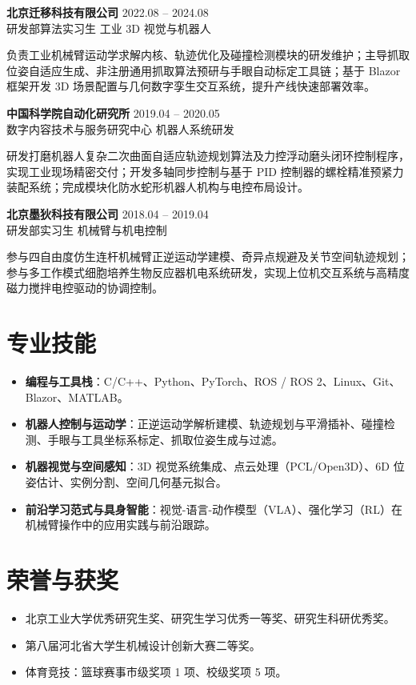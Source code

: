 \documentclass[10.5pt,a4paper]{article}
\newcommand{\entry}[4]{%
  \noindent\textbf{#1} \hfill #2\\
  {\color{subtextgray}#3} \hfill {#4}\par\vspace{1.5pt}
}
\begin{document}
\entry{北京迁移科技有限公司}{2022.08 -- 2024.08}{研发部算法实习生}{工业 3D 视觉与机器人}
负责工业机械臂运动学求解内核、轨迹优化及碰撞检测模块的研发维护；主导抓取位姿自适应生成、非注册通用抓取算法预研与手眼自动标定工具链；基于 Blazor 框架开发 3D 场景配置与几何数字孪生交互系统，提升产线快速部署效率。

\entry{中国科学院自动化研究所}{2019.04 -- 2020.05}{数字内容技术与服务研究中心}{机器人系统研发}
研发打磨机器人复杂二次曲面自适应轨迹规划算法及力控浮动磨头闭环控制程序，实现工业现场精密交付；开发多轴同步控制与基于 PID 控制器的螺栓精准预紧力装配系统；完成模块化防水蛇形机器人机构与电控布局设计。

\entry{北京墨狄科技有限公司}{2018.04 -- 2019.04}{研发部实习生}{机械臂与机电控制}
参与四自由度仿生连杆机械臂正逆运动学建模、奇异点规避及关节空间轨迹规划；参与多工作模式细胞培养生物反应器机电系统研发，实现上位机交互系统与高精度磁力搅拌电控驱动的协调控制。

\section*{专业技能}
\begin{itemize}
	\item \textbf{编程与工具栈}：C/C++、Python、PyTorch、ROS / ROS 2、Linux、Git、Blazor、MATLAB。
	\item \textbf{机器人控制与运动学}：正逆运动学解析建模、轨迹规划与平滑插补、碰撞检测、手眼与工具坐标系标定、抓取位姿生成与过滤。
	\item \textbf{机器视觉与空间感知}：3D 视觉系统集成、点云处理（PCL/Open3D）、6D 位姿估计、实例分割、空间几何基元拟合。
	\item \textbf{前沿学习范式与具身智能}：视觉-语言-动作模型（VLA）、强化学习（RL）在机械臂操作中的应用实践与前沿跟踪。
\end{itemize}

\section*{荣誉与获奖}
\begin{itemize}
	\item 北京工业大学优秀研究生奖、研究生学习优秀一等奖、研究生科研优秀奖。
	\item 第八届河北省大学生机械设计创新大赛二等奖。
	\item 体育竞技：篮球赛事市级奖项 1 项、校级奖项 5 项。
\end{itemize}
\end{document}
